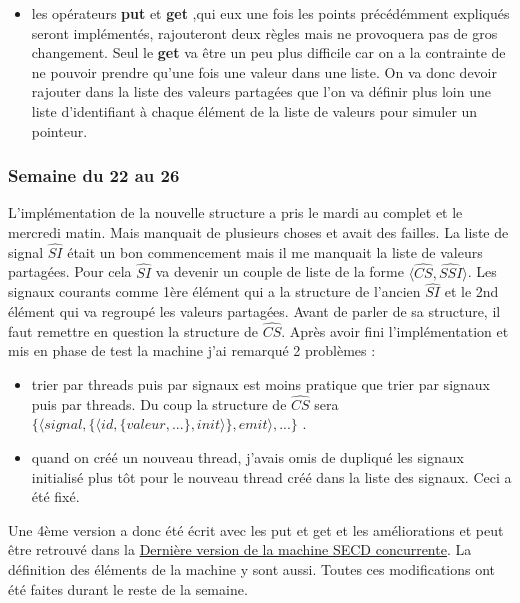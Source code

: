 \documentclass[10pt,a4paper]{article}
\begin{document}
\begin{itemize}
			\item les opérateurs \textbf{put} et \textbf{get} ,qui eux une fois les points précédémment expliqués seront implémentés, rajouteront deux règles mais ne provoquera pas de gros changement.
			\smallbreak 
			Seul le \textbf{get} va être un peu plus difficile car on a la contrainte de ne pouvoir prendre qu'une fois une valeur dans une liste. On va donc devoir rajouter dans la liste des valeurs partagées que l'on va définir plus loin une liste d'identifiant à chaque élément de la liste de valeurs pour simuler un pointeur.
		\end{itemize}
		\bigbreak
		
		
		\subsubsection{Semaine du 22 au 26}
		
		L'implémentation de la nouvelle structure a pris le mardi au complet et le mercredi matin. Mais manquait de plusieurs choses et avait des failles. 
		\smallbreak
		La liste de signal $\widehat{SI}$ était un bon commencement mais il me manquait la liste de valeurs partagées. Pour cela $\widehat{SI}$ va devenir un couple de liste de la forme $\langle\widehat{CS},\widehat{SSI}\rangle$. Les signaux courants comme 1ère élément qui a la structure de l'ancien $\widehat{SI}$ et le 2nd élément qui va regroupé les valeurs partagées. Avant de parler de sa structure, il faut remettre en question la structure de $\widehat{CS}$. 
		\smallbreak
		Après avoir fini l'implémentation et mis en phase de test la machine j'ai remarqué 2 problèmes : 
		\begin{itemize}
			\item trier par threads puis par signaux est moins pratique que trier par signaux puis par threads. Du coup la structure de $\widehat{CS}$ sera $\{ \langle signal , \{\langle id , \{valeur,...\},init\rangle\},emit\rangle,...\}$ .
			\item quand on créé un nouveau thread, j'avais omis de dupliqué les signaux initialisé plus tôt pour le nouveau thread créé dans la liste des signaux. Ceci a été fixé. 
		\end{itemize} 
		\bigbreak
		
		
		Une 4ème version a donc été écrit avec les put et get et les améliorations et peut être retrouvé dans la \hyperref[SECDConc4]{Dernière version de la machine SECD concurrente}. La définition des éléments de la machine y sont aussi. Toutes ces modifications ont été faites durant le reste de la semaine.
		\newpage
\end{document}
